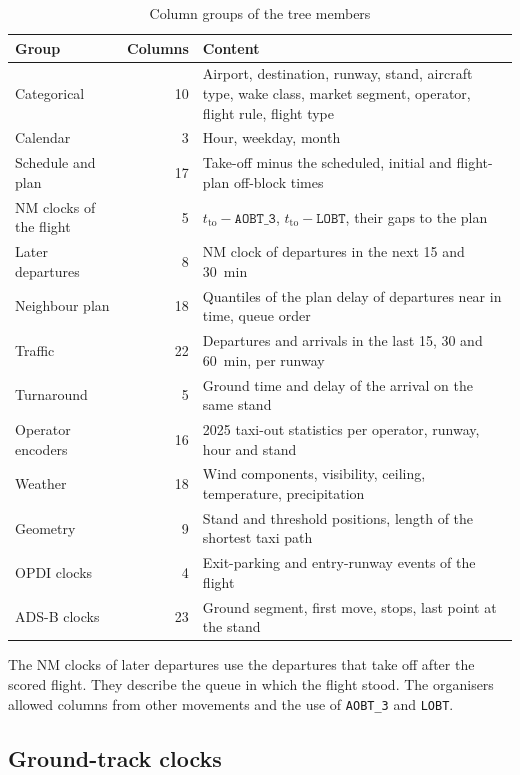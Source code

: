 \documentclass[
  manuscript=article,
  layout=preprint,
  year=2026,
  volume=x,
]{extra/joas}
\begin{document}
\begin{table}[htbp!]
  \centering
  \small
  \caption{Column groups of the tree members}
  \label{tb:columns}
  \begin{tabular}{lrp{}}
  \toprule
  \textbf{Group} & \textbf{Columns} & \textbf{Content} \\
  \midrule
  Categorical & 10 & Airport, destination, runway, stand, aircraft type, wake class, market segment, operator, flight rule, flight type \\
  Calendar & 3 & Hour, weekday, month \\
  Schedule and plan & 17 & Take-off minus the scheduled, initial and flight-plan off-block times \\
  NM clocks of the flight & 5 & $t_{\mathrm{to}} - \texttt{AOBT\_3}$, $t_{\mathrm{to}} - \texttt{LOBT}$, their gaps to the plan \\
  Later departures & 8 & NM clock of departures in the next 15 and 30~min \\
  Neighbour plan & 18 & Quantiles of the plan delay of departures near in time, queue order \\
  Traffic & 22 & Departures and arrivals in the last 15, 30 and 60~min, per runway \\
  Turnaround & 5 & Ground time and delay of the arrival on the same stand \\
  Operator encoders & 16 & 2025 taxi-out statistics per operator, runway, hour and stand \\
  Weather & 18 & Wind components, visibility, ceiling, temperature, precipitation \\
  Geometry & 9 & Stand and threshold positions, length of the shortest taxi path \\
  OPDI clocks & 4 & Exit-parking and entry-runway events of the flight \\
  ADS-B clocks & 23 & Ground segment, first move, stops, last point at the stand \\
  \bottomrule
  \end{tabular}
\end{table}

The NM clocks of later departures use the departures that take off after the scored flight. They describe the queue in which the flight stood. The organisers allowed columns from other movements and the use of \texttt{AOBT\_3} and \texttt{LOBT}.

\subsection{Ground-track clocks}
\end{document}
